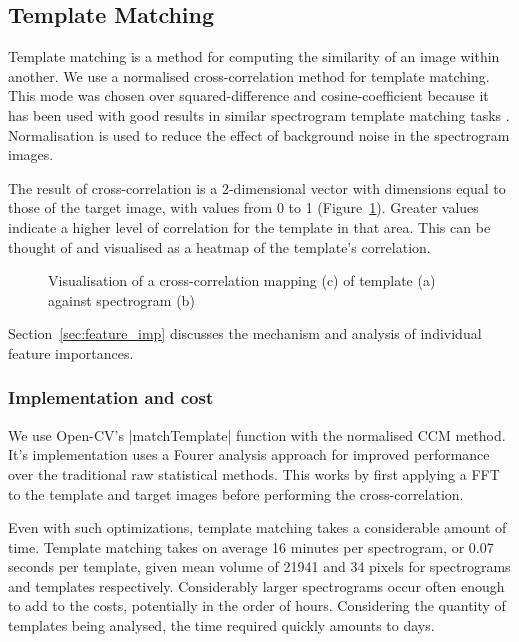 \subsection{Template Matching}
Template matching is a method for computing the similarity of an image within
another.
We use a normalised cross-correlation method for template matching.
This mode was chosen over squared-difference and cosine-coefficient because it
has been used with good results in similar spectrogram template matching tasks
\parencite{lasseck2013}.
Normalisation is used to reduce the effect of background noise in the
spectrogram images.

The result of cross-correlation is a 2-dimensional vector with dimensions equal to
those of the target image, with values from 0 to 1 (Figure~\ref{fig:ccm}).
Greater values indicate a higher level of correlation for the template in that
area.
This can be thought of and visualised as a heatmap of the template's correlation.

\begin{figure}[!htb]
  \centering
  \begin{subfigure}[t]{0.5\textwidth}
    \centering
    \caption{}
  \end{subfigure}
  \begin{subfigure}[t]{0.5\textwidth}
    \centering
    \caption{}
  \end{subfigure}
  \begin{subfigure}[t]{0.5\textwidth}
    \centering
    \caption{}
  \end{subfigure}
  \caption{Visualisation of a cross-correlation mapping (c) of template (a) against
  spectrogram (b)}
  \label{fig:ccm}
\end{figure}

Section~\ref{sec:feature_imp} discusses the mechanism and analysis of individual
feature importances.

\subsubsection{Implementation and cost}
We use Open-CV's |matchTemplate| function with the normalised CCM method.
It's implementation uses a Fourer analysis approach for improved performance over
the traditional raw statistical methods.
This works by first applying a FFT to the template and target images before
performing the cross-correlation.

Even with such optimizations, template matching takes a considerable amount of
time.
Template matching takes on average 16 minutes per spectrogram, or 0.07 seconds
per template,
given mean volume of 21941 and 34 pixels for spectrograms and templates respectively.
Considerably larger spectrograms occur often enough to add to the costs,
potentially in the order of hours.
Considering the quantity of templates being analysed, the time required quickly
amounts to days.

